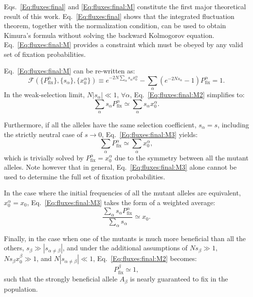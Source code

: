 \documentclass[9pt,twocolumn,twoside]{gsajnl}
\begin{document}
Eqs.~\eqref{Eq:fluxes:final} and \eqref{Eq:fluxes:final:M} constitute the first major theoretical result of this work. Eq.~\eqref{Eq:fluxes:final} shows that the integrated fluctuation theorem, together with the normalization condition,
can be used to obtain Kimura's formula without solving the backward Kolmogorov equation. Eq.~\eqref{Eq:fluxes:final:M} provides a constraint which must be obeyed by any valid set of fixation probabilities.

Eq.~\eqref{Eq:fluxes:final:M} can be re-written as:
\begin{equation} \label{Eq:fluxes:final:M2}
\mathcal{F} (\{ P_{\text{fix}}^{\alpha} \}, \{ s_\alpha \}, \{ x^{\alpha}_{0} \}) \equiv
e^{-2N \sum_{\alpha} s_\alpha x^{\alpha}_{0}} - \sum_{\alpha} \left( e^{-2 N s_\alpha} -1 \right) P_{\text{fix}}^{\alpha} = 1.
\end{equation}
In the weak-selection limit, $N |s_\alpha| \ll 1$, $\forall \alpha$, Eq.~\eqref{Eq:fluxes:final:M2} simplifies to:
\begin{equation} \label{Eq:fluxes:final:M3}
\sum_{\alpha} s_\alpha P_{\text{fix}}^{\alpha} \simeq \sum_{\alpha} s_{\alpha} x^{\alpha}_{0}.
\end{equation}

Furthermore, if all the alleles have the same selection coefficient, $s_\alpha = s$, including the strictly neutral case of $s \to 0$, Eq.~\eqref{Eq:fluxes:final:M3} yields:
\begin{equation} \label{Eq:fluxes:final:M4}
\sum_{\alpha} P_{\text{fix}}^{\alpha} \simeq \sum_{\alpha} x^{\alpha}_{0},
\end{equation}
which is trivially solved by $P_{\text{fix}}^{\alpha} = x^{\alpha}_{0}$ due to the symmetry between all the mutant alleles. %
Note however that in general, Eq.~\eqref{Eq:fluxes:final:M3} alone cannot be used to determine the full set of fixation probabilities.

In the case where the initial frequencies of all the mutant alleles are equivalent, $x^{\alpha}_{0} = x_{0}$, Eq.~\eqref{Eq:fluxes:final:M3} takes the form of a weighted average:
\begin{equation} \label{Eq:fluxes:final:M5}
\frac{\sum_{\alpha} s_\alpha P_{\text{fix}}^{\alpha}}{\sum_{\alpha} s_\alpha} \simeq x_{0}.
\end{equation}

Finally, in the case when one of the mutants is much more beneficial than all the others, $s_\beta \gg |s_{\alpha \ne \beta}|$,
and under the additional assumptions of $N s_\beta \gg 1$, $N s_\beta x^{\beta}_{0} \gg 1$, and $N |s_{\alpha \ne \beta}| \ll 1$,
Eq.~\eqref{Eq:fluxes:final:M2} becomes:
\begin{equation} \label{Eq:fluxes:final:M6}
P_{\text{fix}}^{\beta} \simeq 1,
\end{equation}
such that the strongly beneficial allele $A_\beta$ is nearly guaranteed to fix in the population. %
\end{document}
